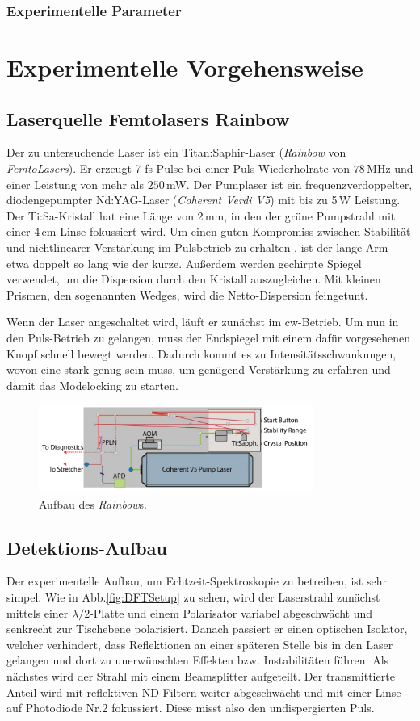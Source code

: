\documentclass[bachelor,       %
               twoside,        %
               BCOR10mm,       %
               english,ngerman, %
               ]{GAUBM}
\begin{document}
\subsection{Experimentelle Parameter}

\chapter{Experimentelle Vorgehensweise}
\section{Laserquelle Femtolasers Rainbow}
Der zu untersuchende Laser ist ein Titan:Saphir-Laser (\textit{Rainbow} von \textit{FemtoLasers}).
Er erzeugt 7-fs-Pulse bei einer Puls-Wiederholrate von $78\,$MHz und einer Leistung von mehr als $250\,$mW.
Der Pumplaser ist ein frequenzverdoppelter, diodengepumpter Nd:YAG-Laser (\textit{Coherent Verdi V5}) mit bis zu 5\,W Leistung.
Der Ti:Sa-Kristall hat eine Länge von 2\,mm, in den der grüne Pumpstrahl mit einer 4\,cm-Linse fokussiert wird.
Um einen guten Kompromiss zwischen Stabilität und nichtlinearer Verstärkung im Pulsbetrieb zu erhalten \cite{stingl_sub-10-fs_1995}, ist der lange Arm etwa doppelt so lang wie der kurze.
Außerdem werden gechirpte Spiegel verwendet, um die Dispersion durch den Kristall auszugleichen.
Mit kleinen Prismen, den sogenannten Wedges, wird die Netto-Dispersion feingetunt.

Wenn der Laser angeschaltet wird, läuft er zunächst im cw-Betrieb.
Um nun in den Puls-Betrieb zu gelangen, muss der Endspiegel mit einem dafür vorgesehenen Knopf schnell bewegt werden.
Dadurch kommt es zu Intensitätsschwankungen, wovon eine stark genug sein muss, um genügend Verstärkung zu erfahren und damit das Modelocking zu starten.
\begin{figure}[!htb]
	\centering
	\includegraphics[width=0.8\textwidth]{figures/rainbow.png}
	\caption{Aufbau des \textit{Rainbow}s.}
	\label{fig:rainbow}
\end{figure}
\section{Detektions-Aufbau}
Der experimentelle Aufbau, um Echtzeit-Spektroskopie zu betreiben, ist sehr simpel.
Wie in Abb.\ref{fig:DFTSetup} zu sehen, wird der Laserstrahl zunächst mittels einer $\lambda/2$-Platte und einem Polarisator variabel abgeschwächt und senkrecht zur Tischebene polarisiert.
Danach passiert er einen optischen Isolator, welcher verhindert, dass Reflektionen an einer späteren Stelle bis in den Laser gelangen und dort zu unerwünschten Effekten bzw. Instabilitäten führen.
Als nächstes wird der Strahl mit einem Beamsplitter aufgeteilt.
Der transmittierte Anteil wird mit reflektiven ND-Filtern weiter abgeschwächt und mit einer Linse auf Photodiode Nr.2 fokussiert.
Diese misst also den undispergierten Puls.
\end{document}

